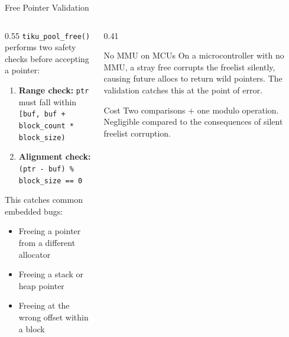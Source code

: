 \documentclass[aspectratio=169, 10pt]{beamer}
\begin{document}
\begin{frame}[fragile]{Free Pointer Validation}
\begin{columns}[T]
\begin{column}{0.55\textwidth}
\texttt{tiku\_pool\_free()} performs two safety checks before
accepting a pointer:

\vspace{0.5em}
\begin{enumerate}
  \item \textbf{Range check:} \texttt{ptr} must fall within
        \texttt{[buf, buf + block\_count * block\_size)}
  \item \textbf{Alignment check:} \texttt{(ptr - buf) \% block\_size == 0}
\end{enumerate}

\vspace{0.5em}
This catches common embedded bugs:
\begin{itemize}
  \item Freeing a pointer from a different allocator
  \item Freeing a stack or heap pointer
  \item Freeing at the wrong offset within a block
\end{itemize}
\end{column}

\begin{column}{0.41\textwidth}
\begin{alertblock}{No MMU on MCUs}
On a microcontroller with no MMU, a stray free corrupts the
freelist silently, causing future allocs to return wild pointers.
The validation catches this at the point of error.
\end{alertblock}

\vspace{0.5em}
\begin{block}{Cost}
Two comparisons + one modulo operation.
Negligible compared to the consequences of silent
freelist corruption.
\end{block}
\end{column}
\end{columns}
\end{frame}
\end{document}

